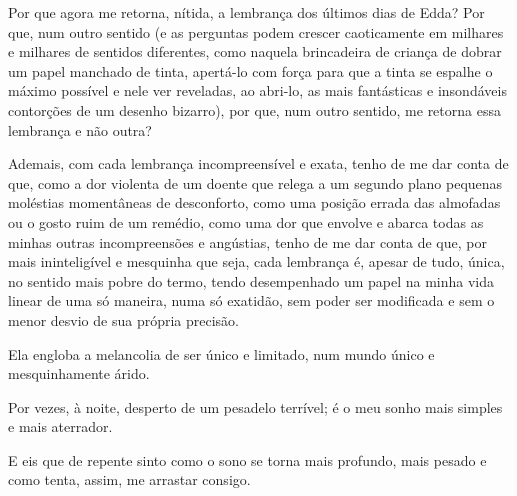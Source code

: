 Por que agora me retorna, nítida, a lembrança dos últimos dias de Edda? Por
que, num outro sentido (e as perguntas podem crescer caoticamente em milhares
e milhares de sentidos diferentes, como naquela brincadeira de criança de
dobrar um papel manchado de tinta, apertá-lo com força para que a tinta se
espalhe o máximo possível e nele ver reveladas, ao abri-lo, as mais
fantásticas e insondáveis contorções de um desenho bizarro), por que, num
outro sentido, me retorna essa lembrança e não outra?

Ademais, com cada lembrança incompreensível e exata, tenho de me dar conta de
que, como a dor violenta de um doente que relega a um segundo plano pequenas
moléstias momentâneas de desconforto, como uma posição errada das almofadas
ou o gosto ruim de um remédio, como uma dor que envolve e abarca todas as
minhas outras incompreensões e angústias, tenho de me dar conta de que, por
mais ininteligível e mesquinha que seja, cada lembrança é, apesar de tudo,
única, no sentido mais pobre do termo, tendo desempenhado um papel na minha
vida linear de uma só maneira, numa só exatidão, sem poder ser modificada e
sem o menor desvio de sua própria precisão.


Ela engloba a melancolia de ser único e limitado, num mundo único e
mesquinhamente árido.

Por vezes, à noite, desperto de um pesadelo terrível; é o meu sonho mais
simples e mais aterrador.


E eis que de repente sinto como o sono se torna mais profundo, mais pesado e
como tenta, assim, me arrastar consigo.

